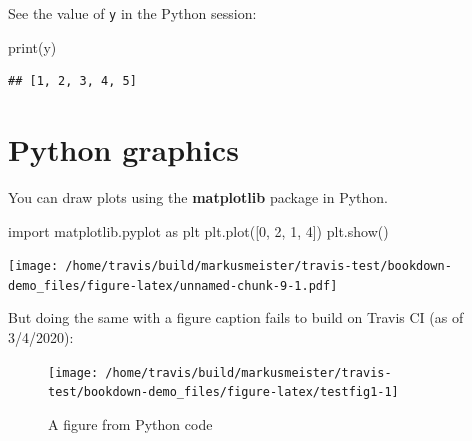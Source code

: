 \documentclass[]{book}
\newenvironment{Shaded}{\begin{snugshade}}{\end{snugshade}}
\newcommand{\BuiltInTok}[1]{#1}
\newcommand{\DecValTok}[1]{\textcolor[rgb]{0.00,0.00,0.81}{#1}}
\newcommand{\ImportTok}[1]{#1}
\newcommand{\NormalTok}[1]{#1}
\begin{document}
See the value of \texttt{y} in the Python session:

\begin{Shaded}
\begin{Highlighting}[]
\BuiltInTok{print}\NormalTok{(y)}
\end{Highlighting}
\end{Shaded}

\begin{verbatim}
## [1, 2, 3, 4, 5]
\end{verbatim}

\hypertarget{python-graphics}{%
\section{Python graphics}\label{python-graphics}}

You can draw plots using the \textbf{matplotlib} package in Python.

\begin{Shaded}
\begin{Highlighting}[]
\ImportTok{import}\NormalTok{ matplotlib.pyplot }\ImportTok{as}\NormalTok{ plt}
\NormalTok{plt.plot([}\DecValTok{0}\NormalTok{, }\DecValTok{2}\NormalTok{, }\DecValTok{1}\NormalTok{, }\DecValTok{4}\NormalTok{])}
\NormalTok{plt.show()}
\end{Highlighting}
\end{Shaded}

\texttt{[image: /home/travis/build/markusmeister/travis-test/bookdown-demo\_files/figure-latex/unnamed-chunk-9-1.pdf]}

But doing the same with a figure caption fails to build on Travis CI (as of 3/4/2020):

\begin{Shaded}
\end{Shaded}

\begin{figure}

{\centering \texttt{[image: /home/travis/build/markusmeister/travis-test/bookdown-demo\_files/figure-latex/testfig1-1]} 

}

\caption{A figure from Python code}\label{fig:testfig1}
\end{figure}
\end{document}
